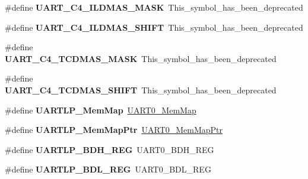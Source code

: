 \begin{DoxyCompactItemize}
\#define {\bfseries U\+A\+R\+T\+\_\+\+C4\+\_\+\+I\+L\+D\+M\+A\+S\+\_\+\+M\+A\+SK}~This\+\_\+symbol\+\_\+has\+\_\+been\+\_\+deprecated
\item 
\mbox{\label{group___backward___compatibility___symbols_ga696b99c80acb65a95530c792e61158a5}} 
\#define {\bfseries U\+A\+R\+T\+\_\+\+C4\+\_\+\+I\+L\+D\+M\+A\+S\+\_\+\+S\+H\+I\+FT}~This\+\_\+symbol\+\_\+has\+\_\+been\+\_\+deprecated
\item 
\mbox{\label{group___backward___compatibility___symbols_ga9a5b6a456c330e9d6b15e612c6e5725a}} 
\#define {\bfseries U\+A\+R\+T\+\_\+\+C4\+\_\+\+T\+C\+D\+M\+A\+S\+\_\+\+M\+A\+SK}~This\+\_\+symbol\+\_\+has\+\_\+been\+\_\+deprecated
\item 
\mbox{\label{group___backward___compatibility___symbols_gad7b56c2826bb55b9112c190448d01176}} 
\#define {\bfseries U\+A\+R\+T\+\_\+\+C4\+\_\+\+T\+C\+D\+M\+A\+S\+\_\+\+S\+H\+I\+FT}~This\+\_\+symbol\+\_\+has\+\_\+been\+\_\+deprecated
\item 
\mbox{\label{group___backward___compatibility___symbols_ga92b653c99e40007d3c3339a79fa0e6a5}} 
\#define {\bfseries U\+A\+R\+T\+L\+P\+\_\+\+Mem\+Map}~\hyperlink{struct_u_a_r_t0___mem_map}{U\+A\+R\+T0\+\_\+\+Mem\+Map}
\item 
\mbox{\label{group___backward___compatibility___symbols_ga589ef759d83410b6f02bd68fcc3bf090}} 
\#define {\bfseries U\+A\+R\+T\+L\+P\+\_\+\+Mem\+Map\+Ptr}~\hyperlink{group___u_a_r_t0___peripheral_gae795171499e041fb9b8f6ad5b97f896b}{U\+A\+R\+T0\+\_\+\+Mem\+Map\+Ptr}
\item 
\mbox{\label{group___backward___compatibility___symbols_ga30ce68ea180cb316cc6ba162f5070dd0}} 
\#define {\bfseries U\+A\+R\+T\+L\+P\+\_\+\+B\+D\+H\+\_\+\+R\+EG}~U\+A\+R\+T0\+\_\+\+B\+D\+H\+\_\+\+R\+EG
\item 
\mbox{\label{group___backward___compatibility___symbols_ga1f4696712b429f26d31e307d3173fcea}} 
\#define {\bfseries U\+A\+R\+T\+L\+P\+\_\+\+B\+D\+L\+\_\+\+R\+EG}~U\+A\+R\+T0\+\_\+\+B\+D\+L\+\_\+\+R\+EG

\end{DoxyCompactItemize}
